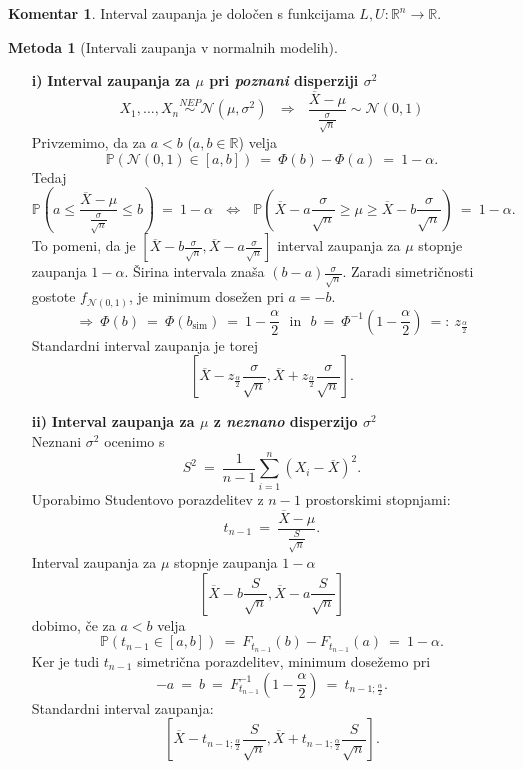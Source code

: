 \documentclass[11pt]{article}
\newcommand{\p}{\mathbb{P}}
\newcommand{\R}{\mathbb{R}}
\newcommand{\1}{\mathbbm{1}}
\newcommand{\n}{\mathcal{N}}
\theoremstyle{definition}
\theoremstyle{definition}
\theoremstyle{definition}
\newtheorem*{komentar}{Komentar}
\newtheorem{metoda}{Metoda}
\begin{document}
\begin{komentar}

Interval zaupanja je določen s funkcijama $L, U: \R^n \rightarrow \R$.

\end{komentar}
\vspace{0.5cm}

\begin{metoda}[Intervali zaupanja v normalnih modelih]
~\\
\begin{enumerate}

\item[\textbf{i)}] \textbf{Interval zaupanja za $\mu$ pri \textit{poznani} disperziji $\sigma^2$} 
$$X_1, \ldots, X_n \overset{NEP}{\sim} \n(\mu, \sigma^2) ~~~\Longrightarrow~~~ \frac{\overline{X} - \mu}{\frac{\sigma}{\sqrt{n}}} \sim \n(0, 1)$$
Privzemimo, da za $a<b$ ($a,b \in \R$) velja
$$\p(\n(0,1) \in [a, b]) ~=~ \Phi(b) - \Phi(a) ~=~ 1-\alpha.$$
Tedaj 
$$\p\left(a \leq \frac{\overline{X} - \mu}{\frac{\sigma}{\sqrt{n}}} \leq b\right) ~=~ 1 - \alpha ~~~\iff~~~ \p\left(\overline{X} - a\frac{\sigma}{\sqrt{n}} \geq \mu \geq \overline{X} - b\frac{\sigma}{\sqrt{n}}\right) ~=~ 1 - \alpha.$$
To pomeni, da je $[\overline{X} - b\frac{\sigma}{\sqrt{n}}, \overline{X} - a\frac{\sigma}{\sqrt{n}}]$ interval zaupanja za $\mu$ stopnje zaupanja $1 - \alpha$. Širina intervala znaša $(b-a)\frac{\sigma}{\sqrt{n}}$. Zaradi simetričnosti gostote $f_{\n(0, 1)}$, je minimum dosežen pri $a = -b$.
$$\Longrightarrow ~\Phi(b) ~=~ \Phi(b_{\text{sim}}) ~=~ 1 - \frac{\alpha}{2} ~~~\text{in}~~~ b ~=~ \Phi^{-1}\left(1-\frac{\alpha}{2}\right) ~=:~ z_{\frac{\alpha}{2}}$$
Standardni interval zaupanja je torej 
$$\left[\overline{X} - z_{\frac{\alpha}{2}} \frac{\sigma}{\sqrt{n}}, \overline{X} + z_{\frac{\alpha}{2}} \frac{\sigma}{\sqrt{n}}\right].$$

\item[\textbf{ii)}] \textbf{Interval zaupanja za $\mu$ z \textit{neznano} disperzijo $\sigma^2$} \\
\noindent Neznani $\sigma^2$ ocenimo s
$$S^2 ~=~ \frac{1}{n-1}\sum_{i=1}^n (X_i - \overline{X})^2.$$
Uporabimo Studentovo porazdelitev z $n-1$ prostorskimi stopnjami:
$$t_{n-1} ~=~ \frac{\overline{X} - \mu}{\frac{S}{\sqrt{n}}}.$$
Interval zaupanja za $\mu$ stopnje zaupanja $1-\alpha$
$$\left[\overline{X} - b\frac{S}{\sqrt{n}}, \overline{X} - a\frac{S}{\sqrt{n}}\right]$$
dobimo, če za $a<b$ velja
$$\p(t_{n-1} \in [a, b]) ~=~ F_{t_{n-1}}(b) - F_{t_{n-1}}(a) ~=~ 1-\alpha.$$
Ker je tudi $t_{n-1}$ simetrična porazdelitev, minimum dosežemo 
pri 
$$-a ~=~ b ~=~ F_{t_{n-1}}^{-1}(1-\frac{\alpha}{2}) ~=~ t_{n-1; \frac{\alpha}{2}}.$$
Standardni interval zaupanja:
$$\left[\overline{X} - t_{n-1; \frac{\alpha}{2}}\frac{S}{\sqrt{n}}, \overline{X} + t_{n-1; \frac{\alpha}{2}}\frac{S}{\sqrt{n}}\right].$$


\end{enumerate}
\end{metoda}
\end{document}
